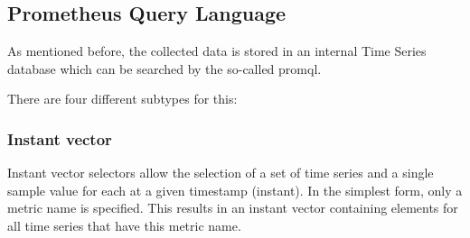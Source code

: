 \subsection{Prometheus Query Language}
\label{subsec:promql}
As mentioned before, the collected data is stored in an internal Time Series database which can be searched by the so-called \gls{promql}.

There are four different subtypes for this:
\subsubsection{Instant vector}
Instant vector selectors allow the selection of a set of time series and a single sample value for each at a given timestamp (instant). In the simplest form, only a metric name is specified. This results in an instant vector containing elements for all time series that have this metric name. 
